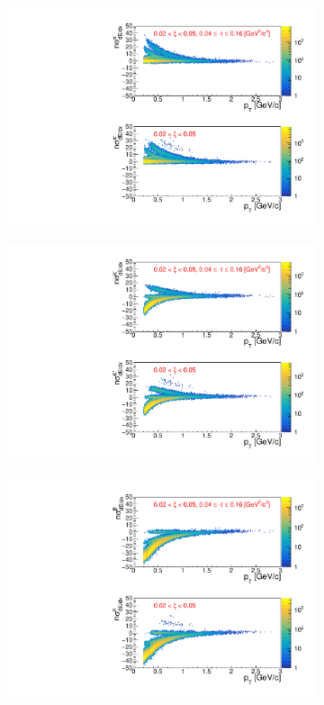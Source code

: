 \begin{figure}[h!]
	\centering
	\begin{subfigure}{.49\textwidth}
		\includegraphics[width=\linewidth, page=1]{chapters/chrgSTAR/img/dEdx/fit2019_2dNsigma_0_0.pdf}
	\end{subfigure}
	\begin{subfigure}{.49\textwidth}
		\includegraphics[width=\linewidth, page=1]{chapters/chrgSTAR/img/dEdx/fit2019_2dNsigma_0_1.pdf}
	\end{subfigure}
	\begin{subfigure}{.49\textwidth}
		\includegraphics[width=\linewidth, page=1]{chapters/chrgSTAR/img/dEdx/fit2019_2dNsigma_0_2.pdf}

\end{subfigure}
\end{figure}
